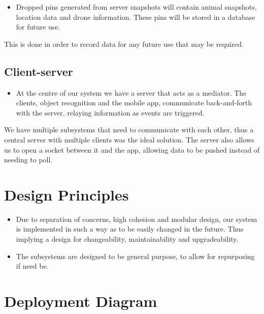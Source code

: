 \begin{itemize}
	\item Dropped pins generated from server snapshots will contain animal snapshots, location data and drone information. 
	These pins will be stored in a database for future use.
\end{itemize}
This is done in order to record data for any future use that may be required.

\subsection{Client-server}

\begin{itemize}
	\item At the centre of our system we have a server that acts as a mediator. The clients, object recognition and the mobile app, 
	communicate back-and-forth with the server, relaying information as events are triggered.
\end{itemize}
We have multiple subsystems that need to communicate with each other, thus a central server with multiple clients was the ideal solution.
The server also allows us to open a socket between it and the app, allowing data to be pushed instead of needing to poll.

\section{Design Principles}

\begin{itemize}
	\item Due to separation of concerns, high cohesion and modular design, our system is implemented in such a way as to be easily changed in the future.
	Thus implying a design for changeability, maintainability and upgradeability.
	\item The subsystems are designed to be general purpose, to allow for repurposing if need be. 
\end{itemize}

\section{Deployment Diagram}


